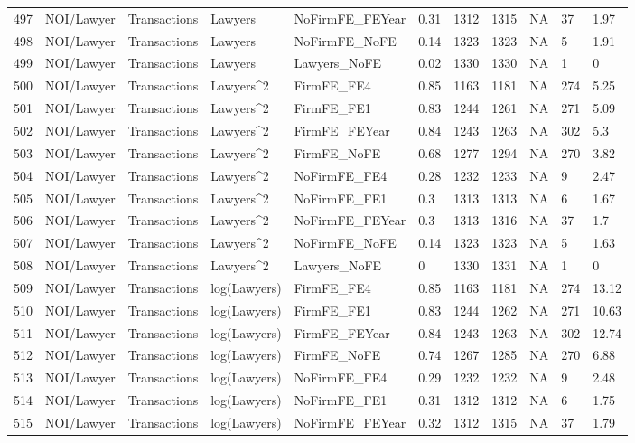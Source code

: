 \begin{table}[ht]
\begin{tabular}{rllllllllll}
  497 & NOI/Lawyer & Transactions & Lawyers & NoFirmFE\_FEYear & 0.31 & 1312 & 1315 & NA & 37 & 1.97 \\ 
  498 & NOI/Lawyer & Transactions & Lawyers & NoFirmFE\_NoFE & 0.14 & 1323 & 1323 & NA & 5 & 1.91 \\ 
  499 & NOI/Lawyer & Transactions & Lawyers & Lawyers\_NoFE & 0.02 & 1330 & 1330 & NA & 1 & 0 \\ 
  500 & NOI/Lawyer & Transactions & Lawyers^2 & FirmFE\_FE4 & 0.85 & 1163 & 1181 & NA & 274 & 5.25 \\ 
  501 & NOI/Lawyer & Transactions & Lawyers^2 & FirmFE\_FE1 & 0.83 & 1244 & 1261 & NA & 271 & 5.09 \\ 
  502 & NOI/Lawyer & Transactions & Lawyers^2 & FirmFE\_FEYear & 0.84 & 1243 & 1263 & NA & 302 & 5.3 \\ 
  503 & NOI/Lawyer & Transactions & Lawyers^2 & FirmFE\_NoFE & 0.68 & 1277 & 1294 & NA & 270 & 3.82 \\ 
  504 & NOI/Lawyer & Transactions & Lawyers^2 & NoFirmFE\_FE4 & 0.28 & 1232 & 1233 & NA & 9 & 2.47 \\ 
  505 & NOI/Lawyer & Transactions & Lawyers^2 & NoFirmFE\_FE1 & 0.3 & 1313 & 1313 & NA & 6 & 1.67 \\ 
  506 & NOI/Lawyer & Transactions & Lawyers^2 & NoFirmFE\_FEYear & 0.3 & 1313 & 1316 & NA & 37 & 1.7 \\ 
  507 & NOI/Lawyer & Transactions & Lawyers^2 & NoFirmFE\_NoFE & 0.14 & 1323 & 1323 & NA & 5 & 1.63 \\ 
  508 & NOI/Lawyer & Transactions & Lawyers^2 & Lawyers\_NoFE & 0 & 1330 & 1331 & NA & 1 & 0 \\ 
  509 & NOI/Lawyer & Transactions & log(Lawyers) & FirmFE\_FE4 & 0.85 & 1163 & 1181 & NA & 274 & 13.12 \\ 
  510 & NOI/Lawyer & Transactions & log(Lawyers) & FirmFE\_FE1 & 0.83 & 1244 & 1262 & NA & 271 & 10.63 \\ 
  511 & NOI/Lawyer & Transactions & log(Lawyers) & FirmFE\_FEYear & 0.84 & 1243 & 1263 & NA & 302 & 12.74 \\ 
  512 & NOI/Lawyer & Transactions & log(Lawyers) & FirmFE\_NoFE & 0.74 & 1267 & 1285 & NA & 270 & 6.88 \\ 
  513 & NOI/Lawyer & Transactions & log(Lawyers) & NoFirmFE\_FE4 & 0.29 & 1232 & 1232 & NA & 9 & 2.48 \\ 
  514 & NOI/Lawyer & Transactions & log(Lawyers) & NoFirmFE\_FE1 & 0.31 & 1312 & 1312 & NA & 6 & 1.75 \\ 
  515 & NOI/Lawyer & Transactions & log(Lawyers) & NoFirmFE\_FEYear & 0.32 & 1312 & 1315 & NA & 37 & 1.79 \\ 

\end{tabular}
\end{table}
